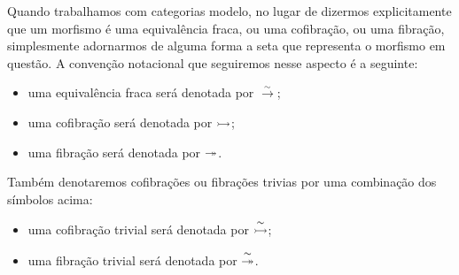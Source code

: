 \begin{obs}
  Quando trabalhamos com categorias modelo, no lugar de dizermos explicitamente que um morfismo é uma equivalência fraca, ou uma cofibração, ou uma fibração, simplesmente adornarmos de alguma forma a seta que representa o morfismo em questão.
  A convenção notacional que seguiremos nesse aspecto é a seguinte:
  \begin{itemize}
  \item uma equivalência fraca será denotada por $\overset{\sim}{\rightarrow}$;
    
  \item uma cofibração será denotada por $\rightarrowtail$;
    
  \item uma fibração será denotada por $\twoheadrightarrow$.
  \end{itemize}
  Também denotaremos cofibrações ou fibrações trivias por uma combinação dos símbolos acima:
  \begin{itemize}
  \item uma cofibração trivial será denotada por $\overset{\sim}{\rightarrowtail}$;
    
  \item uma fibração trivial será denotada por $\overset{\sim}{\twoheadrightarrow}$.
  \end{itemize}


\end{obs}
